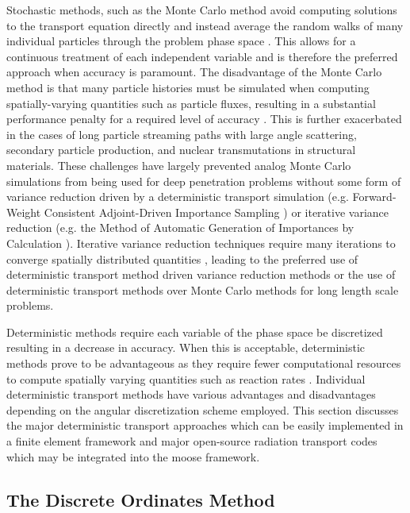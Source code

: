 Stochastic methods, such as the Monte Carlo method avoid computing solutions to the transport equation directly and instead average the random walks of many individual particles through the problem phase space \cite{computational_methods}. This allows for a continuous treatment of each independent variable and is therefore the preferred approach when accuracy is paramount. The disadvantage of the Monte Carlo method is that many particle histories must be simulated when computing spatially-varying quantities such as particle fluxes, resulting in a substantial performance penalty for a required level of accuracy \cite{computational_methods}. This is further exacerbated in the cases of long particle streaming paths with large angle scattering, secondary particle production, and nuclear transmutations in structural materials. These challenges have largely prevented analog Monte Carlo simulations from being used for deep penetration problems without some form of variance reduction driven by a deterministic transport simulation (e.g. Forward-Weight Consistent Adjoint-Driven Importance Sampling \cite{fw_cadis,variance_reduction_review}) or iterative variance reduction (e.g. the Method of Automatic Generation of Importances by Calculation \cite{magic,variance_reduction_review}). Iterative variance reduction techniques require many iterations to converge spatially distributed quantities \cite{variance_reduction_review}, leading to the preferred use of deterministic transport method driven variance reduction methods or the use of deterministic transport methods over Monte Carlo methods for long length scale problems. 

Deterministic methods require each variable of the phase space be discretized resulting in a decrease in accuracy. When this is acceptable, deterministic methods prove to be advantageous as they require fewer computational resources to compute spatially varying quantities such as reaction rates \cite{applied_reactor_physics}. Individual deterministic transport methods have various advantages and disadvantages depending on the angular discretization scheme employed. This section discusses the major deterministic transport approaches which can be easily implemented in a finite element framework and major open-source radiation transport codes which may be integrated into the \acrshort{moose} framework.

\subsection{The Discrete Ordinates Method}
\label{lit_review:radiation_transport:s_n}

